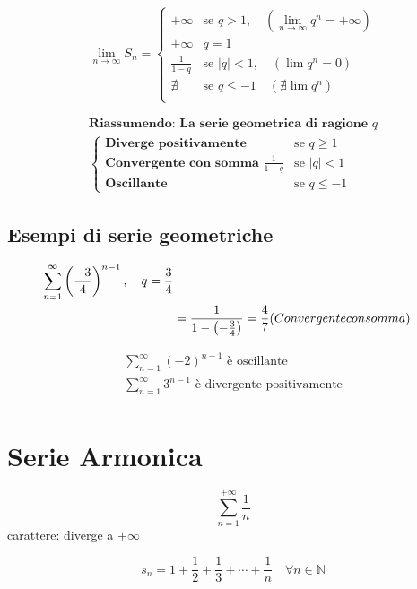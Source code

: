 \documentclass{article}
\begin{document}
\[
    \lim_{n \to \infty} S_n = 
    \begin{cases}
        +\infty & \text{se } q > 1, \quad (\lim_{n \to \infty} q^n = +\infty) \\
        +\infty & q = 1 \\
        \frac{1}{1 - q} & \text{se } |q| < 1, \quad (\lim q^n = 0) \\
        \nexists & \text{se } q \leq -1  \quad (\nexists \lim q^n)\\
    \end{cases}
\]

\begin{align*}
    \textbf{Riassumendo: La serie geometrica di ragione } q \\
    \begin{cases}
        \textbf{Diverge positivamente} & \text{se } q \geq 1 \\
        \textbf{Convergente con somma } \frac{1}{1 - q} & \text{se } |q| < 1 \\
        \textbf{Oscillante} & \text{se } q \leq -1
    \end{cases}
\end{align*}

\subsection*{Esempi di serie geometriche}
\begin{align*}
    \sum_{n=1}^{\infty} \left( \frac{-3}{4}\right )^{n-1}, \quad q = \frac{3}{4} \\
    &= \frac{1}{1-\left(-\frac{3}{4} \right)} = \frac{4}{7}  \text(Convergente con somma )\\
\end{align*}

\begin{align*}
    \sum_{n=1}^\infty \left( -2\right )^{n-1} \text{ è oscillante} \\
    \sum_{n=1}^\infty 3^{n-1} \text{ è divergente positivamente} \\
\end{align*}

\section*{Serie Armonica}
\[
    \sum_{n=1}^{+\infty} \frac{1}{n}
\]
carattere: diverge a $+\infty$

\[
    s_n = 1 + \frac{1}{2} + \frac{1}{3} + \cdots + \frac{1}{n} \quad \forall n \in \mathbb{N}
\]
\end{document}
